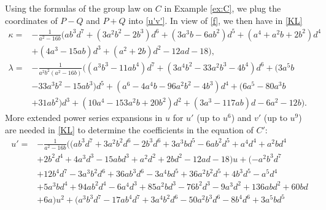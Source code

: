 \documentclass{gtpart}
\theoremstyle{definition}
\theoremstyle{remark}
\newcommand{\K}{\kappa}
\numberwithin{equation}{section}
\numberwithin{thm}{section}
\begin{document}
Using the formulas of the group law on $C$ in Example \ref{ex:C}, we 
plug the coordinates of $P - Q$ and $P + Q$ into \eqref{u'v'}.  In view 
of \eqref{f}, we then have in \eqref{KL} 
\begin{equation*}
\begin{split}
      \K = & -\frac{1}{a^2 - 16 b} \big( a b^3 d^7 + (3 a^2 b^2 - 2 b^3) d^6 + (3 a^3 b - 6 a b^2) d^5 + (a^4 + a^2 b + 2 b^2) d^4 \\
           & + (4 a^3 - 15 a b) d^3 + (a^2 + 2 b) d^2 - 12 a d - 18 \big), \\
 \lambda = & -\frac{1}{a^2 b^2 (a^2 - 16 b)} \big( (a^3  b^3 - 11 a b^4) d^7 + (3 a^4 b^2 - 33 a^2 b^3 - 4 b^4) d^6 + (3 a^5 b \\
           & - 33 a^3 b^2 - 15 a b^3) d^5 + (a^6 - 4 a^4 b - 96 a^2 b^2 - 4 b^3) d^4 + (6 a^5 - 80 a^3 b \\
           & + 31 a b^2) d^3 + (10 a^4 - 153 a^2 b + 20 b^2) d^2 + (3 a^3 - 117 a b) d - 6 a^2 - 12 b \big).  
\end{split}
\end{equation*}
More extended power series expansions in $u$ for $u'$ (up to $u^6$) and 
$v'$ (up to $u^9$) are needed in \eqref{KL} to determine the 
coefficients in the equation of $C'$: 
\begin{equation*}
\begin{split}
     u' = & -\frac{1}{a^2 - 16 b} \big( (a b^3 d^7 + 3 a^2 b^2 d^6 - 2 b^3 d^6 + 3 a^3 b d^5 - 6 a b^2 d^5 + a^4 d^4 + a^2 b d^4 \\
          & + 2 b^2 d^4 + 4 a^3 d^3 - 15 a b d^3 + a^2 d^2 + 2 b d^2 - 12 a d - 18) u + (-a^2 b^3 d^7 \\
          & + 12 b^4 d^7 - 3 a^3 b^2 d^6 + 36 a b^3 d^6 - 3 a^4 b d^5 + 36 a^2 b^2 d^5 + 4 b^3 d^5 - a^5 d^4 \\
          & + 5 a^3 b d^4 + 94 a b^2 d^4 - 6 a^4 d^3 + 85 a^2 b d^3 - 76 b^2 d^3 - 9 a^3 d^2 + 136 a b d^2 + 60 b d \\
          & + 6 a) u^2 + (a^3 b^3 d^7 - 17 a b^4 d^7 + 3 a^4 b^2 d^6 - 50 a^2 b^3 d^6 - 8 b^4 d^6 + 3 a^5 b d^5 
\end{split}
\end{equation*}
\end{document}
